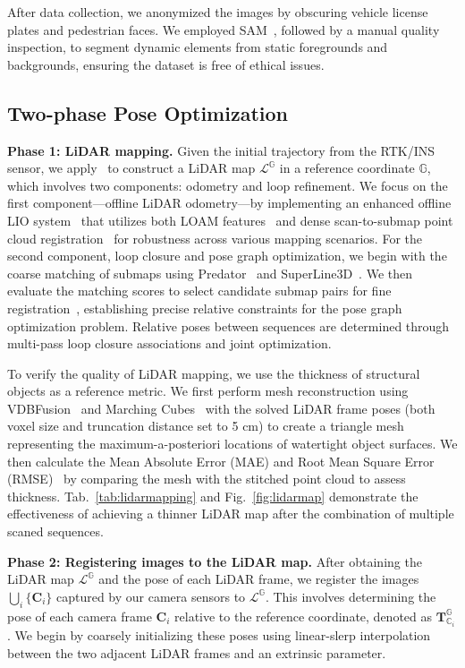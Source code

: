 After data collection, we anonymized the images by obscuring vehicle license plates and pedestrian faces. We employed SAM~\cite{Kirillov2023sam}, followed by a manual quality inspection, to segment dynamic elements from static foregrounds and backgrounds, ensuring the dataset is free of ethical issues.

\subsection{Two-phase Pose Optimization}
\label{sec:dataset:slam}

\noindent \textbf{Phase 1: LiDAR mapping.} 
Given the {initial trajectory} from the RTK/INS sensor, we apply~\cite{yang2018pgo} to construct a LiDAR map $\mathcal{L}^\mathbb{G}$ in a reference coordinate $\mathbb{G}$, which involves two components: odometry and loop refinement. We focus on the first component—offline LiDAR odometry—by implementing an enhanced offline LIO system~\cite{shan2020liosam} that utilizes both LOAM features~\cite{zhang2014loam} and dense scan-to-submap point cloud registration~\cite{segal2009gicp} for robustness across various mapping scenarios. For the second component, loop closure and pose graph optimization, we begin with the coarse matching of submaps using Predator~\cite{huang2021predator} and SuperLine3D~\cite{zhao2022superline3d}. We then evaluate the matching scores to select candidate submap pairs for fine registration~\cite{segal2009gicp}, establishing precise relative constraints for the pose graph optimization problem. Relative poses between sequences are determined through multi-pass loop closure associations and joint optimization.


To verify the quality of LiDAR mapping, we use the thickness of structural objects as a reference metric. We first perform mesh reconstruction using VDBFusion~\cite{vizzo2022sensors} and Marching Cubes~\cite{lorensen87marchingcube} with the solved LiDAR frame poses (both voxel size and truncation distance set to 5 cm) to create a triangle mesh representing the maximum-a-posteriori locations of watertight object surfaces. We then calculate the Mean Absolute Error (MAE) and Root Mean Square Error (RMSE)~\cite{millane2018cblox} by comparing the mesh with the stitched point cloud to assess thickness. Tab.~\ref{tab:lidarmapping} and Fig.~\ref{fig:lidarmap} demonstrate the effectiveness of {achieving a thinner LiDAR map after the combination of multiple scaned sequences.}

\noindent \textbf{Phase 2: Registering images to the LiDAR map.} 
After obtaining the LiDAR map $\mathcal{L}^\mathbb{G}$ and the pose of each LiDAR frame, we register the images $\bigcup_i \{\mathbf{C}_i\}$ captured by our camera sensors to $\mathcal{L}^\mathbb{G}$. This involves determining the pose of each camera frame $\mathbf{C}_i$ relative to the reference coordinate, denoted as $\mathbf{T}_{\mathbb{C}_i}^\mathbb{G}$. We begin by coarsely initializing these poses using linear-slerp interpolation~\cite{buss2001linearslerp} between the two adjacent LiDAR frames and an extrinsic parameter.

